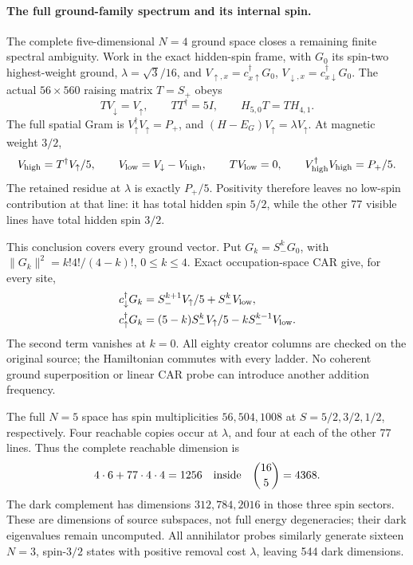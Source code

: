 \paragraph{The full ground-family spectrum and its internal spin.}
The complete five-dimensional $N=4$ ground space closes a remaining
finite spectral ambiguity.  Work in the exact hidden-spin frame, with
$G_0$ its spin-two highest-weight ground, $\lambda=\sqrt3/16$, and
$V_{\uparrow,x}=c_{x\uparrow}^\dagger G_0$,
$V_{\downarrow,x}=c_{x\downarrow}^\dagger G_0$.
The actual $56\times560$ raising matrix $T=S_+$ obeys
\[
 TV_\downarrow=V_\uparrow,\qquad TT^\dagger=5I,
 \qquad H_{5,0}T=TH_{4,1}.
\]
The full spatial Gram is $V_\uparrow^\dagger V_\uparrow=P_+$, and
$(H-E_G)V_\uparrow=\lambda V_\uparrow$.  At magnetic weight $3/2$,
\[
 V_{\rm high}=T^\dagger V_\uparrow/5,\qquad
 V_{\rm low}=V_\downarrow-V_{\rm high},\qquad
 TV_{\rm low}=0,\qquad
 V_{\rm high}^\dagger V_{\rm high}=P_+/5.
\]
The retained residue at $\lambda$ is exactly $P_+/5$.
Positivity therefore leaves no low-spin contribution at that line:
it has total hidden spin $5/2$, while the other 77 visible lines
have total hidden spin $3/2$.

This conclusion covers every ground vector.  Put
$G_k=S_-^kG_0$, with $\|G_k\|^2=k!4!/(4-k)!$, $0\leq k\leq4$.
Exact occupation-space CAR give, for every site,
\begin{align*}
 c_\downarrow^\dagger G_k
 &=S_-^{k+1}V_\uparrow/5+S_-^kV_{\rm low},\\
 c_\uparrow^\dagger G_k
 &=(5-k)S_-^kV_\uparrow/5-kS_-^{k-1}V_{\rm low}.
\end{align*}
The second term vanishes at $k=0$.  All eighty creator columns are
checked on the original source; the Hamiltonian commutes with every
ladder.  No coherent ground superposition or linear CAR probe can
introduce another addition frequency.

The full $N=5$ space has spin multiplicities $56,504,1008$ at
$S=5/2,3/2,1/2$, respectively.  Four reachable copies occur at
$\lambda$, and four at each of the other 77 lines.  Thus the complete
reachable dimension is
\[
 4\cdot6+77\cdot4\cdot4=1256
 \quad\hbox{inside}\quad \binom{16}{5}=4368.
\]
The dark complement has dimensions $312,784,2016$ in those three spin
sectors.  These are dimensions of source subspaces, not full energy
degeneracies; their dark eigenvalues remain uncomputed.
All annihilator probes similarly generate sixteen $N=3$, spin-$3/2$
states with positive removal cost $\lambda$, leaving 544 dark dimensions.

